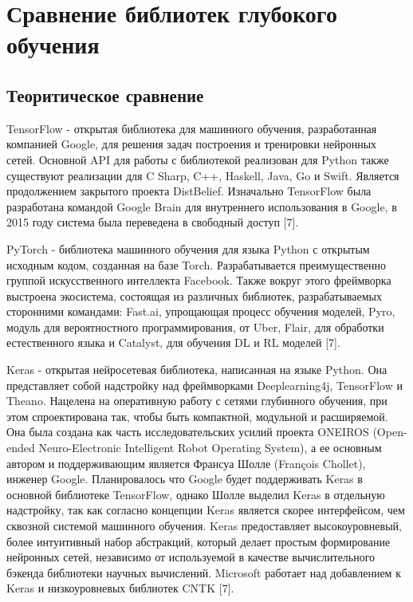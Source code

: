 \documentclass[a4paper]{article}
\begin{document}
\section*{Сравнение библиотек глубокого обучения}
\subsection{Теоритическое сравнение}
TensorFlow - открытая библиотека для машинного обучения, разработанная компанией Google, для решения задач построения и тренировки нейронных сетей. Основной API для работы с библиотекой реализован для Python также существуют реализации для C Sharp, C++, Haskell, Java, Go и Swift. Является продолжением закрытого проекта DistBelief. Изначально TensorFlow была разработана командой Google Brain для внутреннего использования в Google, в 2015 году система была переведена в свободный доступ [7].

PyTorch - библиотека машинного обучения для языка Python с открытым исходным кодом, созданная на базе Torch. Разрабатывается преимущественно группой искусственного интеллекта Facebook. Также вокруг этого фреймворка выстроена экосистема, состоящая из различных библиотек, разрабатываемых сторонними командами: Fast.ai, упрощающая процесс обучения моделей, Pyro, модуль для вероятностного программирования, от Uber, Flair, для обработки естественного языка и Catalyst, для обучения DL и RL моделей [7].

Keras - открытая нейросетевая библиотека, написанная на языке Python. Она представляет собой надстройку над фреймворками Deeplearning4j, TensorFlow и Theano. Нацелена на оперативную работу с сетями глубинного обучения, при этом спроектирована так, чтобы быть компактной, модульной и расширяемой. Она была создана как часть исследовательских усилий проекта ONEIROS (Open-ended Neuro-Electronic Intelligent Robot Operating System), а ее основным автором и поддерживающим является Франсуа Шолле (François Chollet), инженер Google. Планировалось что Google будет поддерживать Keras в основной библиотеке TensorFlow, однако Шолле выделил Keras в отдельную надстройку, так как согласно концепции Keras является скорее интерфейсом, чем сквозной системой машинного обучения. Keras предоставляет высокоуровневый, более интуитивный набор абстракций, который делает простым формирование нейронных сетей, независимо от используемой в качестве вычислительного бэкенда библиотеки научных вычислений. Microsoft работает над добавлением к Keras и низкоуровневых библиотек CNTK [7].
\end{document}
